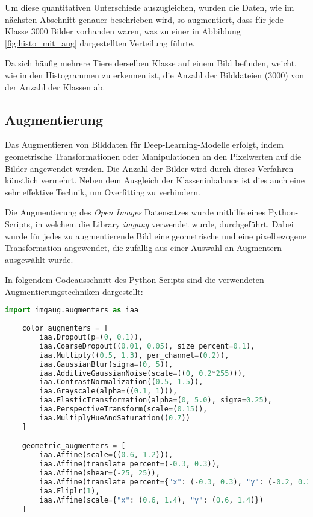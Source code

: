 Um diese quantitativen Unterschiede auszugleichen,
wurden die Daten, wie im nächsten
Abschnitt genauer beschrieben wird, so augmentiert, 
dass für jede Klasse 3000 Bilder vorhanden waren,
was zu einer in Abbildung \ref{fig:histo_mit_aug} 
dargestellten Verteilung führte.

Da sich häufig mehrere Tiere derselben Klasse 
auf einem Bild befinden, weicht, wie in den Histogrammen 
zu erkennen ist, die Anzahl der Bilddateien (3000) von 
der Anzahl der Klassen ab.



\subsection{Augmentierung}\label{subsec:augmentation}

Das Augmentieren von Bilddaten für Deep-Learning-Modelle
erfolgt, indem geometrische Transformationen oder Manipulationen 
an den Pixelwerten auf die Bilder angewendet werden.
Die Anzahl der Bilder wird durch dieses Verfahren 
künstlich vermehrt.
Neben dem Ausgleich der Klasseninbalance ist dies 
auch eine sehr effektive Technik, um
Overfitting zu verhindern.

Die Augmentierung des \textit{Open Images} Datensatzes 
wurde mithilfe eines Python-Scripts, in welchem die Library 
\textit{imgaug} \cite{imgaug} verwendet wurde, durchgeführt.
Dabei wurde für jedes zu augmentierende Bild eine geometrische und 
eine pixelbezogene Transformation angewendet, die 
zufällig aus einer Auswahl an Augmentern ausgewählt wurde.

In folgendem Codeausschnitt des Python-Scripts sind die 
verwendeten Augmentierungstechniken dargestellt:

\begin{lstlisting}[language=Python]
    import imgaug.augmenters as iaa
    
    color_augmenters = [
        iaa.Dropout(p=(0, 0.1)),
        iaa.CoarseDropout((0.01, 0.05), size_percent=0.1),
        iaa.Multiply((0.5, 1.3), per_channel=(0.2)),
        iaa.GaussianBlur(sigma=(0, 5)),
        iaa.AdditiveGaussianNoise(scale=((0, 0.2*255))),
        iaa.ContrastNormalization((0.5, 1.5)),
        iaa.Grayscale(alpha=((0.1, 1))),
        iaa.ElasticTransformation(alpha=(0, 5.0), sigma=0.25),
        iaa.PerspectiveTransform(scale=(0.15)),
        iaa.MultiplyHueAndSaturation((0.7))
    ]

    geometric_augmenters = [
        iaa.Affine(scale=((0.6, 1.2))),
        iaa.Affine(translate_percent=(-0.3, 0.3)),
        iaa.Affine(shear=(-25, 25)),
        iaa.Affine(translate_percent={"x": (-0.3, 0.3), "y": (-0.2, 0.2)}),
        iaa.Fliplr(1),
        iaa.Affine(scale={"x": (0.6, 1.4), "y": (0.6, 1.4)})
    ]
    
\end{lstlisting}


